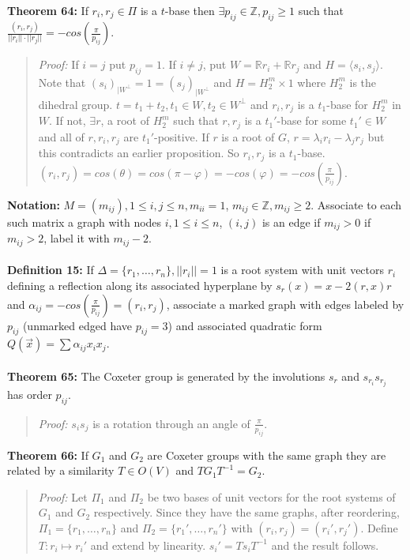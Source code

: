 {\bf Theorem 64:}
If $r_i, r_j \in \Pi$ is a $t$-base
 then $\exists p_{ij} \in {\mathbb Z}, p_{ij} \ge 1$ such that
${\frac {(r_i, r_j)} {||r_i|| \cdot ||r_j||}}= -cos({\frac {\pi} {p_{ij}}})$.
\begin{quote}
\emph{Proof:}
If $i=j$ put $p_{ij}=1$.  If $i \ne j$, put $W= {\mathbb R} r_i + {\mathbb R} r_j$ and
$H= \langle s_i, s_j \rangle$.  Note that 
$(s_i)_{|W^{\perp}}= 1= (s_j)_{|W^{\perp}}$ and $H= 
H_2^m \times 1$ where
$H_2^m$ is the dihedral group.
$t= t_1 + t_2, t_1 \in W, t_2 \in W^{\perp}$ and $r_i, r_j$ is a $t_1$-base for
$H_2^m$ in $W$.  If not, $\exists r$, a root of
$H_2^m$ such that $r, r_j$ is a $t_1'$-base for some $t_1' \in W$ and
all of $r, r_i, r_j$ are $t_1'$-positive.  If $r$ is a root of $G$,
$r= \lambda_i r_i - \lambda_j r_j$ but this contradicts an earlier proposition.
So $r_i, r_j$ is a $t_1$-base.
$(r_i, r_j)= cos(\theta)= cos (\pi - \varphi) = - cos(\varphi)= - cos({\frac {\pi} {p_{ij}}})$.
\end{quote}
{\bf Notation:} $M= (m_{ij}), 1 \le i,j \le n, m_{ii}=1$, 
$m_{ij} \in {\mathbb Z}, m_{ij} \ge 2$.  Associate to each
such matrix a graph with nodes $i, 1 \le i \le n$, $(i,j)$ is an edge if $m_{ij}>0$ if
$m_{ij}>2$, label it with $m_{ij}-2$.
\\
\\
{\bf Definition 15:} If $\Delta= \{ r_1 , \ldots , r_n \}, ||r_i||=1$ 
is a root system with unit vectors
$r_i$ defining a reflection along its associated hyperplane by 
$s_r (x) = x-2(r,x)r$ and
$\alpha_{ij}= -cos({\frac {\pi} {p_{ij}}})= (r_i , r_j)$, associate a marked
graph with edges labeled by $p_{ij}$ (unmarked edged have $p_{ij}=3$) and associated
quadratic form $Q({\vec x})= \sum \alpha_{ij} x_i x_j$.
\\
\\
{\bf Theorem 65:} The Coxeter group is generated
by the involutions $s_r$ and $s_{r_i} s_{r_j}$ has order $p_{ij}$.  
\begin{quote}
\emph{Proof:}
$s_i s_j$ is a rotation through an angle of ${\frac {\pi} {p_{ij}}}$.
\end{quote}
{\bf Theorem 66:}
If $G_1$ and $G_2$ are Coxeter groups with the same graph they are related by a similarity
$T \in O(V)$ and $T G_1 T^{-1}= G_2$.
\begin{quote}
\emph{Proof:}
Let $\Pi_1$ and $\Pi_2$ be two bases of unit vectors for the root systems of $G_1$ and
$G_2$ respectively.  Since they have the same graphs, after reordering,
$\Pi_1= \{ r_1 , \ldots , r_n \}$ and
$\Pi_2= \{ r_1' , \ldots , r_n' \}$ with $(r_i, r_j)= (r_i', r_j')$.  Define $T: r_i \mapsto r_i'$
and extend by linearity.  $s_i' = T s_i T^{-1}$ and the result follows.
\end{quote}
